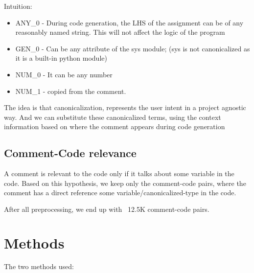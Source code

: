 \documentclass{IEEEtran}
\begin{document}
    Intuition:
    \begin{itemize}
      \item 
      ANY\_0 - During code generation, the LHS of the assignment can be
              of any reasonably named string. This will not affect the 
              logic of the program                                    
      \item
      GEN\_0 - Can be any attribute of the sys module; (sys is not    
              canonicalized as it is a built-in python module)      
      \item
      NUM\_0 - It can be any number                                 
      \item
      NUM\_1 - copied from the comment.                            
      \end{itemize}
      The idea is that canonicalization, represents the user intent
      in a project agnostic way. And we can substitute these      
      canonicalized terms, using the context information based on
      where the comment appears during code generation       

    \subsection{Comment-Code relevance}
    A comment is relevant to the code only if it talks about some                                                                                                   
          variable in the code. Based on this hypothesis, we keep only the                                                                                                
          comment-code pairs, where the comment has a direct reference                                                                                                    
          some variable/canonicalized-type in the code.

          After all preprocessing, we end up with ~12.5K comment-code pairs.
    \section{Methods}

    The two methods used:
\end{document}
